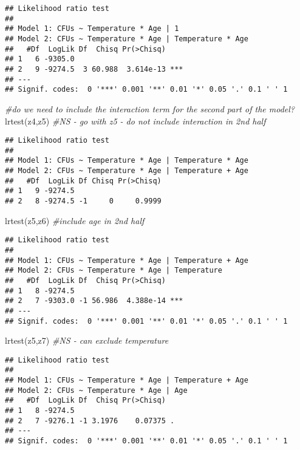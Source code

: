 \documentclass[
]{article}
\newenvironment{Shaded}{\begin{snugshade}}{\end{snugshade}}
\newcommand{\CommentTok}[1]{\textcolor[rgb]{0.56,0.35,0.01}{\textit{#1}}}
\newcommand{\FunctionTok}[1]{\textcolor[rgb]{0.00,0.00,0.00}{#1}}
\newcommand{\NormalTok}[1]{#1}
\begin{document}
\begin{verbatim}
## Likelihood ratio test
## 
## Model 1: CFUs ~ Temperature * Age | 1
## Model 2: CFUs ~ Temperature * Age | Temperature * Age
##   #Df  LogLik Df  Chisq Pr(>Chisq)    
## 1   6 -9305.0                         
## 2   9 -9274.5  3 60.988  3.614e-13 ***
## ---
## Signif. codes:  0 '***' 0.001 '**' 0.01 '*' 0.05 '.' 0.1 ' ' 1
\end{verbatim}

\begin{Shaded}
\begin{Highlighting}[]
\CommentTok{\#do we need to include the interaction term for the second part of the model?}
\FunctionTok{lrtest}\NormalTok{(z4,z5) }\CommentTok{\#NS {-} go with z5 {-} do not include interaction in 2nd half}
\end{Highlighting}
\end{Shaded}

\begin{verbatim}
## Likelihood ratio test
## 
## Model 1: CFUs ~ Temperature * Age | Temperature * Age
## Model 2: CFUs ~ Temperature * Age | Temperature + Age
##   #Df  LogLik Df Chisq Pr(>Chisq)
## 1   9 -9274.5                    
## 2   8 -9274.5 -1     0     0.9999
\end{verbatim}

\begin{Shaded}
\begin{Highlighting}[]
\FunctionTok{lrtest}\NormalTok{(z5,z6) }\CommentTok{\#include age in 2nd half}
\end{Highlighting}
\end{Shaded}

\begin{verbatim}
## Likelihood ratio test
## 
## Model 1: CFUs ~ Temperature * Age | Temperature + Age
## Model 2: CFUs ~ Temperature * Age | Temperature
##   #Df  LogLik Df  Chisq Pr(>Chisq)    
## 1   8 -9274.5                         
## 2   7 -9303.0 -1 56.986  4.388e-14 ***
## ---
## Signif. codes:  0 '***' 0.001 '**' 0.01 '*' 0.05 '.' 0.1 ' ' 1
\end{verbatim}

\begin{Shaded}
\begin{Highlighting}[]
\FunctionTok{lrtest}\NormalTok{(z5,z7) }\CommentTok{\#NS {-} can exclude temperature}
\end{Highlighting}
\end{Shaded}

\begin{verbatim}
## Likelihood ratio test
## 
## Model 1: CFUs ~ Temperature * Age | Temperature + Age
## Model 2: CFUs ~ Temperature * Age | Age
##   #Df  LogLik Df  Chisq Pr(>Chisq)  
## 1   8 -9274.5                       
## 2   7 -9276.1 -1 3.1976    0.07375 .
## ---
## Signif. codes:  0 '***' 0.001 '**' 0.01 '*' 0.05 '.' 0.1 ' ' 1
\end{verbatim}
\end{document}
